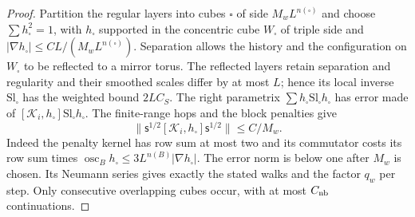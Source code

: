 \documentclass[11pt,letterpaper,reqno]{amsart}
\theoremstyle{definition}
\theoremstyle{remark}
\begin{document}
\begin{proof}
Partition the regular layers into cubes $\square$ of side
$M_wL^{n(\square)}$ and choose $\sum h_\square^2=1$, with
$h_\square$ supported in the concentric cube $W_\square$ of
triple side and $|\nabla h_\square|\le
CL/(M_wL^{n(\square)})$.  Separation allows the history and the
configuration on $W_\square$ to be reflected to a mirror torus.
The reflected layers retain separation and regularity and their
smoothed scales differ by at most $L$; hence its local inverse
$\mathrm{Sl}_\square$ has the weighted bound $2LC_S$.
The right parametrix
$\sum h_\square\mathrm{Sl}_\square h_\square$ has error made
of $[\mathcal K_i,h_\square]\mathrm{Sl}_\square h_\square$.
The finite-range hops and the block penalties give
\[
 \|\mathsf s^{1/2}[\mathcal K_i,h_\square]
                         \mathsf s^{1/2}\|\le C/M_w.
\]
Indeed the penalty kernel has row sum at most two and its
commutator costs its row sum times
$\operatorname{osc}_Bh_\square\le3L^{n(B)}|\nabla h_\square|$.
The error norm is below one after $M_w$ is chosen.  Its Neumann
series gives exactly the stated walks and the factor $q_w$ per
step.  Only consecutive overlapping cubes occur, with at most
$C_{\rm nb}$ continuations.


\end{proof}
\end{document}
